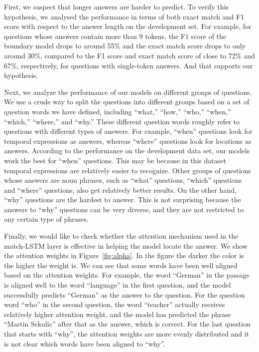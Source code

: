 \documentclass{article} \usepackage{iclr2017_conference,times}
\begin{document}
First, we suspect that longer answers are harder to predict.
To verify this hypothesis, we analysed the performance in terms of both exact match and F1 score with respect to the answer length on the development set.
For example, for questions whose answers contain more than 9 tokens, the F1 score of the boundary model drops to around 55\% and the exact match score drops to only around 30\%, compared to the F1 score and exact match score of close to 72\% and 67\%, respectively, for questions with single-token answers. And that supports our hypothesis.

Next, we analyze the performance of our models on different groups of questions.
We use a crude way to split the questions into different groups based on a set of question words we have defined, including ``what,'' ``how,'' ``who,'' ``when,''  ``which,'' ``where,'' and ``why.''
These different question words roughly refer to questions with different types of answers.
For example, ``when'' questions look for temporal expressions as answers, whereas ``where'' questions look for locations as answers.
According to the performance on the development data set, our models work the best for ``when'' questions.
This may be because in this dataset temporal expressions are relatively easier to recognize.
Other groups of questions whose answers are noun phrases, such as ``what'' questions, ``which'' questions and ``where'' questions, also get relatively better results.
On the other hand, ``why'' questions are the hardest to answer.
This is not surprising because the answers to ``why'' questions can be very diverse, and they are not restricted to any certain type of phrases.



Finally, we would like to check whether the attention mechanism used in the match-LSTM layer is effective in helping the model locate the answer.
We show the attention weights  in Figure~\ref{fig:alpha}.
In the figure the darker the color is the higher the weight is.
We can see that some words have been well aligned based on the attention weights.
For example, the word ``German'' in the passage is aligned well to the word ``language'' in the first question, and the model successfully predicts ``German'' as the answer to the question.
For the question word ``who'' in the second question, the word ``teacher'' actually receives relatively higher attention weight, and the model has predicted the phrase ``Martin Sekulic'' after that as the answer, which is correct.
For the last question that starts with ``why'', the attention weights are more evenly distributed and it is not clear which words have been aligned to ``why''.
\end{document}
